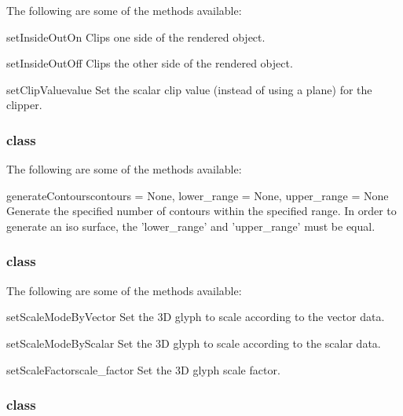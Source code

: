 The following are some of the methods available:

\begin{methoddesc}[Clipper]{setInsideOutOn}{}
Clips one side of the rendered object.
\end{methoddesc}

\begin{methoddesc}[Clipper]{setInsideOutOff}{}
Clips the other side of the rendered object.
\end{methoddesc}

\begin{methoddesc}[Clipper]{setClipValue}{value}
Set the scalar clip value (instead of using a plane) for the clipper.
\end{methoddesc}

\subsubsection{\ContourModule class}

The following are some of the methods available:

\begin{methoddesc}[ContourModule]{generateContours}{contours = None, 
lower_range = None, upper_range = None}
Generate the specified number of contours within the specified range.
In order to generate an iso surface, the 'lower_range' and 'upper_range' 
must be equal.
\end{methoddesc}

\subsubsection{\GlyphThreeD class}

The following are some of the methods available:

\begin{methoddesc}[Glyph3D]{setScaleModeByVector}{}
Set the 3D glyph to scale according to the vector data.
\end{methoddesc}

\begin{methoddesc}[Glyph3D]{setScaleModeByScalar}{}
Set the 3D glyph to scale according to the scalar data.
\end{methoddesc}

\begin{methoddesc}[Glyph3D]{setScaleFactor}{scale_factor}
Set the 3D glyph scale factor.
\end{methoddesc}

\subsubsection{\TensorGlyph class}

